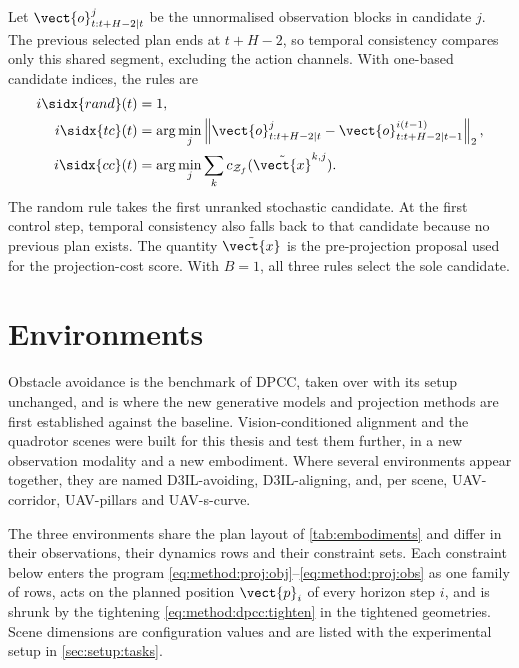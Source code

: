 Let $\vect{o}^{j}_{t:t+H-2|t}$ be the unnormalised observation blocks in candidate $j$.
The previous selected plan ends at $t+H-2$, so temporal consistency compares only this shared
segment, excluding the action channels. With one-based candidate indices, the rules are
\begin{equation}\label{eq:method:sel:rules}
\begin{aligned}
  i\sidx{rand}(t)&=1,\\
  i\sidx{tc}(t)&=\arg\min_j\left\|\vect{o}^{j}_{t:t+H-2|t}
                -\vect{o}^{i(t-1)}_{t:t+H-2|t-1}\right\|_2,\\
  i\sidx{cc}(t)&=\arg\min_j\sum_k c_{\mathcal{Z}_f}(\tilde{\vect{x}}^{k,j}).
\end{aligned}
\end{equation}
The random rule takes the first unranked stochastic candidate. At the first control step, temporal
consistency also falls back to that candidate because no previous plan exists. The quantity
$\tilde{\vect{x}}$ is the pre-projection proposal used for the projection-cost score. With $B=1$,
all three rules select the sole candidate.

\section{Environments}\label{sec:method:envs}

Obstacle avoidance is the
benchmark of \ac{DPCC}, taken over with its setup unchanged, and is where the new generative models
and projection methods are first established against the baseline. Vision-conditioned alignment and the
quadrotor scenes were built for this thesis and test them further, in a new observation modality and a
new embodiment. Where several environments appear together, they are named D3IL-avoiding,
D3IL-aligning, and, per scene, UAV-corridor, UAV-pillars and UAV-s-curve.

The three environments share the plan layout of \autoref{tab:embodiments} and differ in their
observations, their dynamics rows and their constraint sets. Each constraint below enters the program
\eqref{eq:method:proj:obj}--\eqref{eq:method:proj:obs} as one family of rows, acts on the planned
position $\vect{p}_{i}$ of every horizon step $i$, and is shrunk by the tightening
\eqref{eq:method:dpcc:tighten} in the tightened geometries. Scene dimensions are configuration values and
are listed with the experimental setup in \autoref{sec:setup:tasks}.

